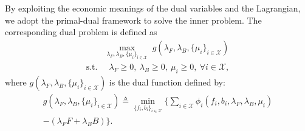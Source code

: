 \documentclass[lettersize,journal]{IEEEtran}
\begin{document}
By exploiting the economic meanings of the dual variables and the Lagrangian, we adopt the primal-dual framework to solve the inner problem. 
The corresponding dual problem is defined as
\begin{align}\label{eq:dual-problem}
&\max_{\lambda_F,\lambda_B,\{\mu_i\}_{i\in \mathcal{X}}} \;  g(\lambda_F,\lambda_B,\{\mu_i\}_{i\in \mathcal{X}}) \\
\text{s.t.} &\;\;  \lambda_F \ge 0, \ \lambda_B \ge 0, \nonumber \
 \mu_i \ge 0, \ \forall i \in \mathcal{X}, \nonumber
\end{align}
where $g(\lambda_F,\lambda_B,\{\mu_i\}_{i\in \mathcal{X}})$ is the dual function defined by:
\begin{equation}\label{eq:dual-function}
\begin{split}
    g(\lambda_F,\lambda_B,\{\mu_i\}_{i\in \mathcal{X}}) \triangleq \min_{\{f_i,b_i\}_{i\in \mathcal{X}}} \Big\{ \sum_{i\in \mathcal{X}} \phi_i(f_i, b_i, \lambda_F, \lambda_B, \mu_i) \\- (\lambda_F F + \lambda_B B) \Big\}.
\end{split}
\end{equation}
\end{document}
